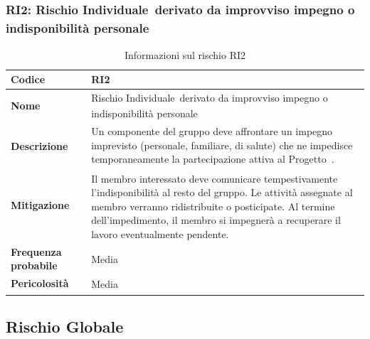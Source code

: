 \documentclass[a4paper,12pt]{article}
\newcommand{\pediceG}{\texorpdfstring{\textsubscript{\scalebox{0.6}{\textbf{G}}}~}{G}}
\begin{document}
\subsubsection{RI2: Rischio Individuale\pediceG derivato da improvviso impegno o indisponibilità personale}
\begin{table}[H]
\centering
\begin{tabular}{|>{\raggedright\arraybackslash}p{4cm}|>{\raggedright\arraybackslash}p{10cm}|}
\hline
\textbf{Codice} & RI2 \\
\hline
\textbf{Nome} & Rischio Individuale\pediceG derivato da improvviso impegno o indisponibilità personale \\
\hline
\textbf{Descrizione} & Un componente del gruppo deve affrontare un impegno imprevisto (personale, familiare, di salute) che ne impedisce temporaneamente la partecipazione attiva al Progetto\pediceG. \\
\hline
\textbf{Mitigazione\pediceG} & Il membro interessato deve comunicare tempestivamente l'indisponibilità al resto del gruppo. Le attività assegnate al membro verranno ridistribuite o posticipate. Al termine dell'impedimento, il membro si impegnerà a recuperare il lavoro eventualmente pendente. \\
\hline
\textbf{Frequenza probabile} & Media \\
\hline
\textbf{Pericolosità\pediceG} & Media \\
\hline
\end{tabular}
\caption{Informazioni sul rischio RI2}
\label{tab:ri2}
\end{table}

\newpage
\subsection{Rischio Globale\pediceG}
\end{document}
